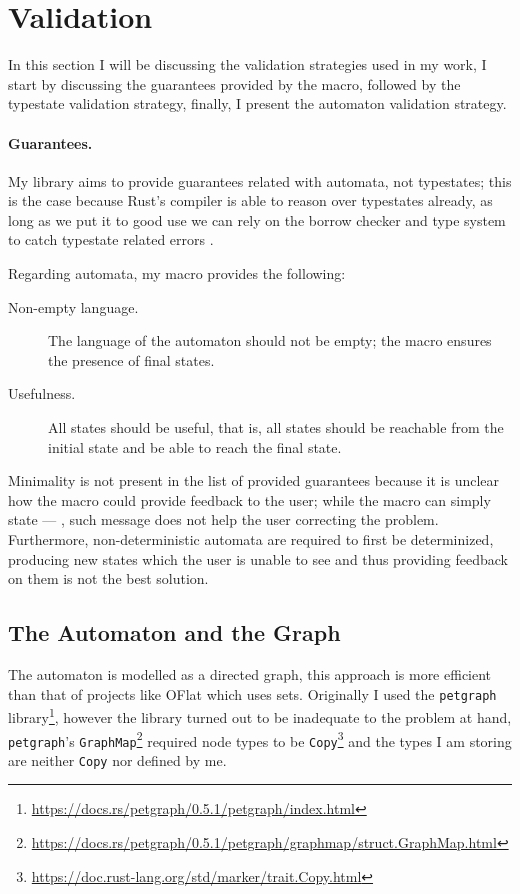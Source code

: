 \section{Validation}\label{sec:validation}

In this section I will be discussing the validation strategies used in my work,
I start by discussing the guarantees provided by the macro,
followed by the typestate validation strategy, finally, I present the automaton validation strategy.

\paragraph{Guarantees.} My library aims to provide guarantees related with automata, not typestates;
this is the case because Rust's compiler is able to reason over typestates already,
as long as we put it to good use we can rely on the borrow checker and type system to catch typestate related errors
.

Regarding automata, my macro provides the following:
\begin{description}
    \item[Non-empty language.] The language of the automaton should not be empty;
    the macro ensures the presence of final states.
    \item[Usefulness.] All states should be useful, that is,
    all states should be reachable from the initial state and be able to reach the final state.
\end{description}

Minimality is not present in the list of provided guarantees because it is unclear how the macro could provide feedback to the user;
while the macro can simply state --- , such message does not help the user correcting the problem.
Furthermore, non-deterministic automata are required to first be determinized,
producing new states which the user is unable to see and thus providing feedback on them is not the best solution.

\subsection{The Automaton and the Graph}\label{sec:validation:automaton}

The automaton is modelled as a directed graph, this approach is more efficient than that of projects like OFlat which uses sets. %
Originally I used the \texttt{petgraph} library\footnote{\url{https://docs.rs/petgraph/0.5.1/petgraph/index.html}},
however the library turned out to be inadequate to the problem at hand,
\texttt{petgraph}'s \texttt{GraphMap}\footnote{\url{https://docs.rs/petgraph/0.5.1/petgraph/graphmap/struct.GraphMap.html}}
required node types to be \texttt{Copy}\footnote{\url{https://doc.rust-lang.org/std/marker/trait.Copy.html}} and
the types I am storing are neither \texttt{Copy} nor defined by me.

